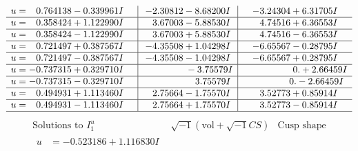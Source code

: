 \documentclass[1p]{elsarticle_modified}
\theoremstyle{definition}
\newcommand{\I}{\sqrt{-1}}
\begin{document}
$$\begin{array}{c|c|c}
\begin{aligned}
u &= \phantom{-}0.764138 - 0.339961 I\end{aligned}
 & -2.30812 - 8.68200 I & -3.24304 + 6.31705 I \\ \hline\begin{aligned}
u &= \phantom{-}0.358424 + 1.122990 I\end{aligned}
 & \phantom{-}3.67003 - 5.88530 I & \phantom{-}4.74516 + 6.36553 I \\ \hline\begin{aligned}
u &= \phantom{-}0.358424 - 1.122990 I\end{aligned}
 & \phantom{-}3.67003 + 5.88530 I & \phantom{-}4.74516 - 6.36553 I \\ \hline\begin{aligned}
u &= \phantom{-}0.721497 + 0.387567 I\end{aligned}
 & -4.35508 + 1.04298 I & -6.65567 - 0.28795 I \\ \hline\begin{aligned}
u &= \phantom{-}0.721497 - 0.387567 I\end{aligned}
 & -4.35508 - 1.04298 I & -6.65567 + 0.28795 I \\ \hline\begin{aligned}
u &= -0.737315 + 0.329710 I\end{aligned}
 & \phantom{-0.000000 } -3.75579 I & \phantom{-0.000000 -}0. + 2.66459 I \\ \hline\begin{aligned}
u &= -0.737315 - 0.329710 I\end{aligned}
 & \phantom{-0.000000 -}3.75579 I & \phantom{-0.000000 } 0. - 2.66459 I \\ \hline\begin{aligned}
u &= \phantom{-}0.494931 + 1.113460 I\end{aligned}
 & \phantom{-}2.75664 - 1.75570 I & \phantom{-}3.52773 + 0.85914 I \\ \hline\begin{aligned}
u &= \phantom{-}0.494931 - 1.113460 I\end{aligned}
 & \phantom{-}2.75664 + 1.75570 I & \phantom{-}3.52773 - 0.85914 I\\
 \hline 
 \end{array}$$\newpage$$\begin{array}{c|c|c}  
\text{Solutions to }I^u_{1}& \I (\text{vol} + \sqrt{-1}CS) & \text{Cusp shape}\\
 \hline 
\begin{aligned}
u &= -0.523186 + 1.116830 I\end{aligned}

\end{array}$$
\end{document}
